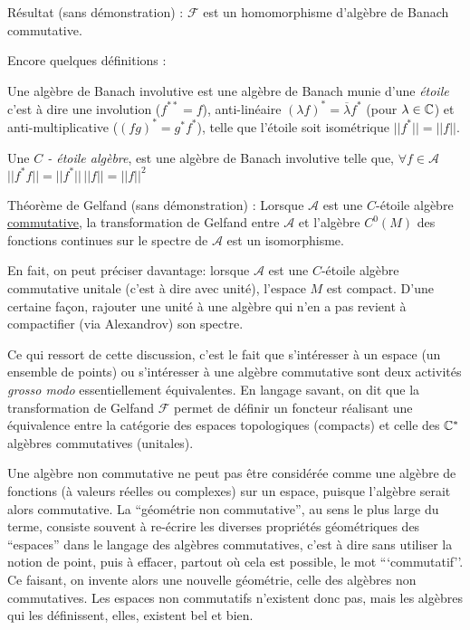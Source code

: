 R\'esultat (sans d\'emonstration) : ${\mathcal F}$ est un homomorphisme 
d'alg\`ebre de Banach commutative.

Encore quelques d\'efinitions : 

Une alg\`ebre de Banach involutive  est une alg\`ebre de Banach  munie d'une 
{\sl \'etoile\/} c'est \`a dire une 
involution ($f^{**} = f$), anti-lin\'eaire $(\lambda f)^{*} = 
\overline{\lambda} f^{*}$ (pour $\lambda \in \mathbb{C}$) et  
anti-multiplicative ($(fg)^{*}=g^{*}f^{*}$), telle que l'\'etoile 
soit isom\'etrique $\vert \vert f^{*} \vert \vert = \vert \vert f \vert \vert$.

Une {\sl $C$ - \'etoile alg\`ebre\/},  est une alg\`ebre de Banach involutive 
telle que, $\forall f \in {\mathcal A}$ 
$\vert \vert f^{*}f \vert \vert = \vert \vert f^{*} \vert \vert \, \vert 
\vert f \vert \vert = \vert \vert f \vert \vert^{2}
$

Th\'eor\`eme de Gelfand  (sans d\'emonstration) : 
Lorsque ${\mathcal A}$ est une $C$-\'etoile alg\`ebre \underline{commutative}, la 
transformation de Gelfand entre ${\mathcal A}$ et l'alg\`ebre ${C^{0}(M)}$ des 
fonctions continues sur le spectre de ${\mathcal A}$ est un isomorphisme.

En fait, on peut pr\'eciser davantage: lorsque ${\mathcal A}$ est une 
$C$-\'etoile alg\`ebre {commutative} unitale (c'est \`a dire 
avec unit\'e), l'espace $M$ est compact. D'une certaine fa\c con, rajouter 
une unit\'e \`a une alg\`ebre qui n'en a pas revient \`a compactifier 
(via Alexandrov) son spectre.

Ce qui ressort de cette discussion, c'est le fait que s'int\'eresser \`a un espace (un ensemble de points) 
ou s'int\'eresser \`a une alg\`ebre  commutative sont deux activit\'es {\it grosso modo \/}
essentiellement \'equivalentes. En langage savant, on dit que la 
transformation de Gelfand ${\mathcal F}$ permet de d\'efinir un
foncteur r\'ealisant une \'equivalence entre la cat\'egorie des espaces topologiques 
(compacts) et celle des $\mathbb{C}^{*}$ alg\`ebres commutatives (unitales).

Une alg\`ebre non commutative ne peut pas \^etre consid\'er\'ee comme une alg\`ebre de 
fonctions (\`a valeurs r\'eelles ou complexes) sur un espace, puisque 
l'alg\`ebre serait alors commutative. 
La ``g\'eom\'etrie non commutative'', au sens le plus large du terme, 
consiste souvent \`a re-\'ecrire les diverses propri\'et\'es g\'eom\'etriques des 
``espaces'' dans le langage des alg\`ebres commutatives, c'est \`a dire 
sans utiliser la notion de point, puis \`a effacer, partout o\`u cela est 
possible, le mot ```commutatif''. Ce faisant, on invente alors une 
nouvelle g\'eom\'etrie, celle des alg\`ebres non commutatives. Les espaces 
non commutatifs n'existent donc pas, mais les alg\`ebres qui les 
d\'efinissent, elles, existent bel et bien.

